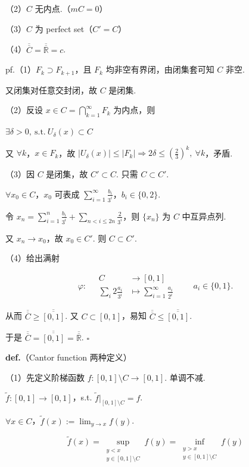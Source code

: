 \documentclass[11pt]{ctexart}
\theoremstyle{definition}
\begin{document}
（2）$C$ 无内点.（$mC = 0$）

（3）$C$ 为 perfect set（$C' = C$）

（4）$\overline{\overline{C}} = \overline{\overline{\mathbb{R}}} = c$.

pf.（1）$F_k \supset F_{k+1}$，且 $F_k$ 均非空有界闭，由闭集套可知 $C$ 非空.

又闭集对任意交封闭，故 $C$ 是闭集.

（2）反设 $x \in C = \bigcap_{k=1}^{\infty} F_k$ 为内点，则

$\exists \delta > 0,\ \text{s.t.}\ U_\delta(x) \subset C$

又 $\forall k$，$x \in F_k$，故 $\vert U_\delta(x)\vert \leq \vert F_k\vert \Rightarrow 2\delta \leq (\tfrac{2}{3})^k,\ \forall k$，矛盾.

（3）因 $C$ 是闭集，故 $C' \subset C$. 只需 $C \subset C'$.

$\forall x_0 \in C$，$x_0$ 可表成 $\sum_{i=1}^{\infty} \frac{b_i}{3^i}$，$b_i \in \{0, 2\}$.

令 $x_n = \sum_{i=1}^{n} \frac{b_i}{3^i} + \sum_{n < i \leq 2n} \frac{2}{3^i}$，则 $\{x_n\}$ 为 $C$ 中互异点列.

又 $x_n \to x_0$，故 $x_0 \in C'$. 则 $C \subset C'$.

（4）给出满射

\[
\varphi:\quad \begin{aligned} C &\to [0,1] \\ \sum_{i} 2\frac{a_i}{3^i} &\mapsto \sum_{i=1}^{\infty} \frac{a_i}{2^i} \end{aligned} \qquad a_i \in \{0,1\}.
\]

从而 $\overline{\overline{C}} \geq \overline{\overline{[0,1]}}$. 又 $C \subset [0,1]$，易知 $\overline{\overline{C}} \leq \overline{\overline{[0,1]}}$.

于是 $\overline{\overline{C}} = \overline{\overline{[0,1]}} = \overline{\overline{\mathbb{R}}}$. $\square$

\textbf{def.}（Cantor function 两种定义）

（1）先定义阶梯函数 $f: [0,1] \setminus C \to [0,1]$. 单调不减.

$\widetilde{f}: [0,1] \to [0,1]$，s.t. $\widetilde{f}\big\vert_{[0,1] \setminus C} = f$.

$\forall x \in C$，$\widetilde{f}(x) := \lim_{y \to x} f(y)$.

\[
\widetilde{f}(x) = \sup_{\substack{y < x \\ y \in [0,1] \setminus C}} f(y) = \inf_{\substack{y > x \\ y \in [0,1] \setminus C}} f(y)
\]
\end{document}
